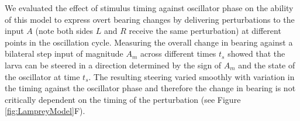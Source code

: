 \documentclass[11pt,a4paper]{article}
\newcommand{\todoBW}[1]{\todo[author=BW,color=orange, size=\tiny,inline]{#1}}
\begin{document}

We evaluated the effect of stimulus timing against oscillator phase  on the ability of this model to express overt bearing changes by delivering perturbations to the input $A$ (note both sides $L$ and $R$ receive the same perturbation) at different points in the oscillation cycle.
 Measuring the overall change in bearing against a bilateral step input of magnitude $A_m$ across different times $t_s$ showed that the larva can be steered in a direction determined by the sign of $A_m$ and the state of the oscillator at time $t_s$.
  The resulting steering varied smoothly with variation in the timing against the oscillator phase and therefore the change in bearing is not critically dependent on the timing of the perturbation (see Figure \ref{fig:LampreyModel}F). 

\end{document}
